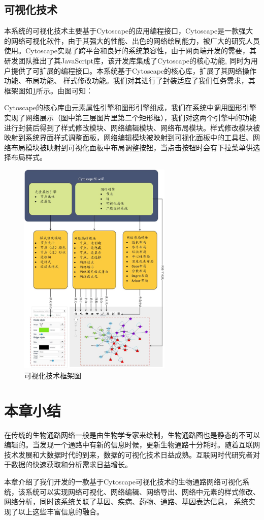 \subsection{可视化技术}
本系统的可视化技术主要基于Cytoscape的应用编程接口，Cytoscape是一款强大的网络可视化软件，由于其强大的性能、出色的网络绘制能力，被广大的研究人员使用。Cytoscape实现了跨平台和良好的系统兼容性，由于网页端开发的需要，其研发团队推出了其JavaScript库，该开发库集成了Cytoscape的核心功能, 同时为用户提供了可扩展的编程接口。本系统基于Cytoscape的核心库，扩展了其网络操作功能、布局功能、 样式修改功能。我们对其进行了封装适应了我们任务需求，其框架图如\ref{fig33}所示。由图可知：


Cytoscape的核心库由元素属性引擎和图形引擎组成，我们在系统中调用图形引擎实现了网络展示（图中第三层图片里第二个矩形框），我们对这两个引擎中的功能进行封装后得到了样式修改模块、网络编辑模块、网络布局模块。样式修改模块被映射到系统界面样式调整面板，网络编辑模块被映射到可视化面板中的工具栏、网络布局模块被映射到可视化面板中布局调整按钮，当点击按钮时会有下拉菜单供选择布局样式。

\begin{figure}[h]
\centering
\includegraphics[width = 0.65\textwidth]{versioframework}
\caption[fig33]{可视化技术框架图}
\label{fig33}
\end{figure}

\section{本章小结}
在传统的生物通路网络一般是由生物学专家来绘制，生物通路图也是静态的不可以编辑的。当发现一个通路中有新的信息时候，更新生物通路十分耗时。随着互联网技术发展和大数据时代的到来，数据的可视化技术日益成熟。互联网时代研究者对于数据的快速获取和分析需求日益增长。

本章介绍了我们开发的一款基于Cytoscape可视化技术的生物通路网络可视化系统，该系统可以实现网络可视化、网络编辑、网络导出、网络中元素的样式修改、网络分析，同时该系统关联了基因、疾病、药物、通路、基因表达信息， 系统实现了以上这些丰富信息的融合。

